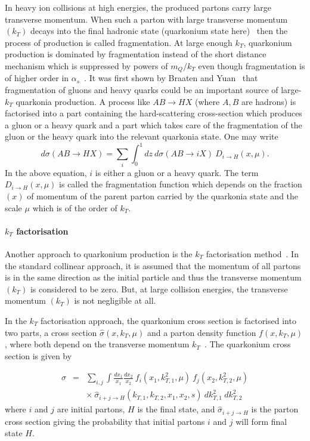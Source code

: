 In heavy ion collisions at high energies, the produced partons
carry large transverse momentum.
When such a parton  with large transverse momentum $(k_T)$ decays into the final
hadronic state (quarkonium state here)~\cite{frag} then the process of production is called
fragmentation. At large enough $k_T$, quarkonium production is dominated by
fragmentation instead of the short distance mechanism which 
is suppressed by powers of $m_Q/k_T$ even though fragmentation is of higher
order in $\alpha_s$~\cite{frag}. 
It was first shown by Braaten and Yuan~\cite{frag,frag1} that fragmentation of
gluons and heavy quarks
 could be an important source of large-$k_T$ quarkonia production.
 A process like $A  B \rightarrow H  X$ (where $A,B$ are  hadrons)
is factorised  into a part containing the hard-scattering cross-section which produces
 a gluon or a heavy quark 
and a part which takes care of the fragmentation of the gluon or the heavy quark into the
relevant quarkonia state. One may write 
\begin{equation}
d\sigma (A  B \rightarrow H X) = \sum_i \int_0^1 dz \ d\sigma  (A  B \rightarrow i  X) \ D_{i \rightarrow H} (x,\mu).
\end{equation}
In the above equation, $i$ is either a gluon or a heavy quark. The term $D_{i \rightarrow H} (x,\mu)$ 
is called the fragmentation function which depends on the fraction $(x)$ of momentum of the parent
parton carried by the quarkonia state and the scale $\mu$ which is of the order of $k_T$. 

\paragraph{$k_T$ factorisation}

Another approach to quarkonium production is the $k_T$ factorisation method~\cite{kt1,kt2}.
In the  standard collinear approach, it is assumed that the momentum of all partons is
in the same direction as the initial particle and thus the  transverse momentum $(k_T)$ is
considered to be zero. But, at large collision energies, the transverse
momentum $(k_T)$ is not negligible at all. 
 
In the $k_T$ factorisation approach, the quarkonium cross section is factorised
into two parts,  a cross section ${\hat \sigma} (x, k_T, \mu)$ and a parton
density function $f(x, k_T, \mu)$, where both depend on the transverse
momentum $k_T$~\cite{kt3}.  The quarkonium cross section is given by 
 
\begin{eqnarray}
   \sigma &=& \sum_{i,j} \int \frac {dx_1}{x_1} \frac {dx_2}{x_2} \
            f_i (x_1, k_{T,1}^2, \mu) \  f_j (x_2, k_{T,2}^2, \mu) \nonumber \\
    && \times \ {\hat \sigma}_{i+j \rightarrow H} (k_{T,1}, k_{T,2}, x_1, x_2, s) \ dk^2_{T,1} \ dk^2_{T,2}
\end{eqnarray}
where $i$ and $j$ are initial partons, $H$ is the final state,
 and ${\hat \sigma}_{i+j \rightarrow H}$ is the parton cross
section giving the probability that initial partons $i$ and $j$ will form final state $H$.
